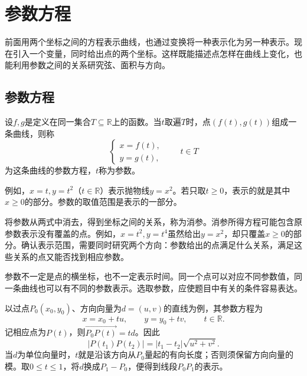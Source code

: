 \newpage
\section{参数方程}
\label{sec:quadratic-parametric-equations}

前面用两个坐标之间的方程表示曲线，也通过变换将一种表示化为另一种表示。现在引入一个变量，同时给出点的两个坐标。这样既能描述点怎样在曲线上变化，也能利用参数之间的关系研究弦、面积与方向。

\subsection{参数方程}
\label{subsec:quadratic-parametric-equations}

\begin{definition}
设\(f,g\)是定义在同一集合\(T\subseteq\mathbb R\)上的函数。当\(t\)取遍\(T\)时，点\((f(t),g(t))\)组成一条曲线，则称
\begin{equation}\label{eq:quadratic-parametric-definition}
    \begin{cases}x=f(t),\\y=g(t),\end{cases}\qquad t\in T
\end{equation}
为这条曲线的{\heiti{}参数方程}，\(t\)称为参数。
\end{definition}

例如，\(x=t,y=t^2\)（\(t\in\mathbb R\)）表示抛物线\(y=x^2\)。若只取\(t\ge0\)，表示的就是其中\(x\ge0\)的部分。参数的取值范围是表示的一部分。

将参数从两式中消去，得到坐标之间的关系，称为{\heiti{}消参}。消参所得方程可能包含原参数表示没有覆盖的点。例如，\(x=t^2,y=t^4\)虽然给出\(y=x^2\)，却只覆盖\(x\ge0\)的部分。确认表示范围，需要同时研究两个方向：参数给出的点满足什么关系，满足这些关系的点又能否找到相应参数。

参数不一定是点的横坐标，也不一定表示时间。同一个点可以对应不同参数值，同一条曲线也可以有不同的参数表示。选取参数，应使题目中有关的条件容易表达。

以过点\(P_0(x_0,y_0)\)、方向向量为\(d=(u,v)\)的直线为例，其参数方程为
\begin{equation}\label{eq:quadratic-line-parametric}
    x=x_0+tu,\qquad y=y_0+tv,\qquad t\in\mathbb R .
\end{equation}
记相应点为\(P(t)\)，则\(\overrightarrow{P_0P(t)}=td\)。因此
\begin{equation}\label{eq:quadratic-parametric-distance}
    |P(t_1)P(t_2)|=|t_1-t_2|\sqrt{u^2+v^2} .
\end{equation}
当\(d\)为单位向量时，\(t\)就是沿该方向从\(P_0\)量起的有向长度；否则须保留方向向量的模。取\(0\le t\le1\)，将\(d\)换成\(P_1-P_0\)，便得到线段\(P_0P_1\)的表示。

